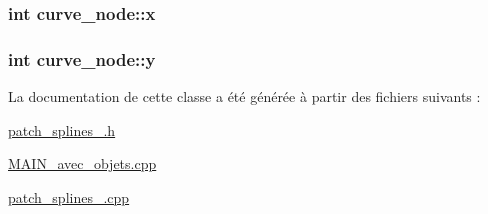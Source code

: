 \hypertarget{classcurve__node_aa7ae8f2ee3bbd3e6194785c392751cdb}{
\subsubsection[{x}]{\setlength{\rightskip}{0pt plus 5cm}int curve\+\_\+node\+::x}}\label{classcurve__node_aa7ae8f2ee3bbd3e6194785c392751cdb}
\hypertarget{classcurve__node_afc1f4f007a920aa79c1f1f0ff0b49465}{
\subsubsection[{y}]{\setlength{\rightskip}{0pt plus 5cm}int curve\+\_\+node\+::y}}\label{classcurve__node_afc1f4f007a920aa79c1f1f0ff0b49465}


La documentation de cette classe a été générée à partir des fichiers suivants \+:\begin{DoxyCompactItemize}
\item 
\hyperlink{patch__splines__2_8h}{patch\+\_\+splines\+\_.\+h}\item 
\hyperlink{_m_a_i_n__avec__objets_8cpp}{M\+A\+I\+N\+\_\+avec\+\_\+objets.\+cpp}\item 
\hyperlink{patch__splines__2_8cpp}{patch\+\_\+splines\+\_.\+cpp}\end{DoxyCompactItemize}
